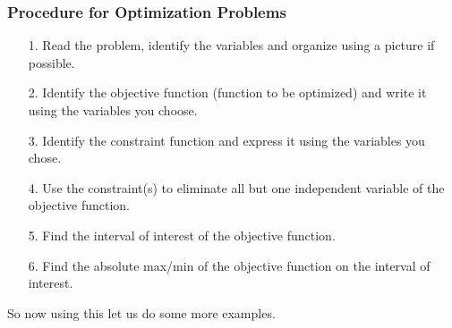 \documentclass[12pt,reqno]{article}
\theoremstyle{definition}
\begin{document}
\subsubsection{Procedure for Optimization Problems}
	\begin{enumerate}
		\item[1.] Read the problem, identify the variables and organize using a picture if possible. 
		\item[2.] Identify the objective function (function to be optimized) and write it using the variables you choose. 
		\item[3.] Identify the constraint function and express it using the variables you chose. 
		\item[4.] Use the constraint(s) to eliminate all but one independent variable of the objective function. 
		\item[5.] Find the interval of interest of the objective function. 
		\item[6.] Find the absolute max/min of the objective function on the interval of interest.
	\end{enumerate}
	
So now using this let us do some more examples. 
\end{document}
